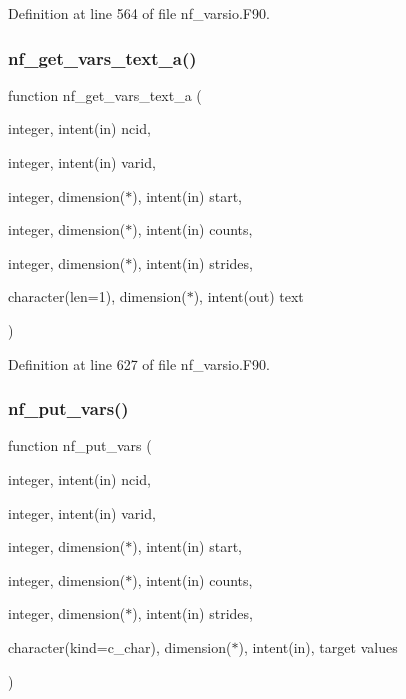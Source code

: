 Definition at line 564 of file nf\+\_\+varsio.\+F90.

\mbox{\label{nf__varsio_8F90_ae3f2667a79da79ab4d85c1d07addbab3}} 
\subsubsection{\texorpdfstring{nf\+\_\+get\+\_\+vars\+\_\+text\+\_\+a()}{nf\_get\_vars\_text\_a()}}
{\footnotesize\ttfamily function nf\+\_\+get\+\_\+vars\+\_\+text\+\_\+a (\begin{DoxyParamCaption}\item[{integer, intent(in)}]{ncid,  }\item[{integer, intent(in)}]{varid,  }\item[{integer, dimension($\ast$), intent(in)}]{start,  }\item[{integer, dimension($\ast$), intent(in)}]{counts,  }\item[{integer, dimension($\ast$), intent(in)}]{strides,  }\item[{character(len=1), dimension($\ast$), intent(out)}]{text }\end{DoxyParamCaption})}



Definition at line 627 of file nf\+\_\+varsio.\+F90.

\mbox{\label{nf__varsio_8F90_a1c00336b474470cac7f8f18ee7ac1a58}} 
\subsubsection{\texorpdfstring{nf\+\_\+put\+\_\+vars()}{nf\_put\_vars()}}
{\footnotesize\ttfamily function nf\+\_\+put\+\_\+vars (\begin{DoxyParamCaption}\item[{integer, intent(in)}]{ncid,  }\item[{integer, intent(in)}]{varid,  }\item[{integer, dimension($\ast$), intent(in)}]{start,  }\item[{integer, dimension($\ast$), intent(in)}]{counts,  }\item[{integer, dimension($\ast$), intent(in)}]{strides,  }\item[{character(kind=c\+\_\+char), dimension($\ast$), intent(in), target}]{values }\end{DoxyParamCaption})}



